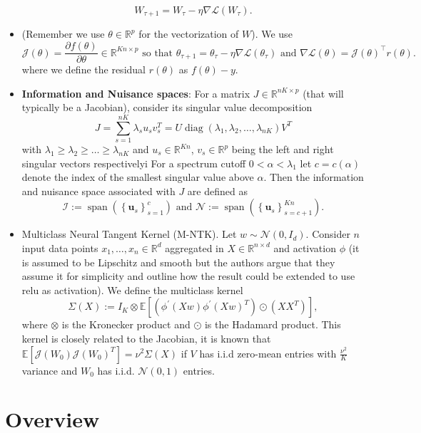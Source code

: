 \documentclass[a4paper]{article}
\newcommand{\R}{\mathbb{R}}
\begin{document}
\begin{itemize}
    \[
        W_{\tau+1}=W_{\tau}-\eta \nabla \mathcal{L}\left(W_{\tau}\right).
    \] 
\item (Remember we use $\theta\in\R^{p}$ for the vectorization of $W$). We use
    \[
        \mathcal{J}(\theta) = \frac{\partial f(\theta)}{\partial \theta}  \in \R^{Kn\times p}\text{ so that } \theta_{\tau+1} = \theta_\tau - \eta \nabla \mathcal{L}(\theta_\tau) \text{ and } \nabla\mathcal{L}(\theta) = \mathcal{J}(\theta)^\top r(\theta).
    \] 
    where we define the residual $r(\theta)$ as $f(\theta)- y$.
\item \textbf{Information and Nuisance spaces}: For a matrix $J \in \R^{nK\times p}$ (that will typically be a Jacobian), consider its singular value decomposition
    \[
    J=\sum_{s=1}^{n K} \lambda_{s} u_{s} v_{s}^{T}=U \operatorname{diag}\left(\lambda_{1}, \lambda_{2}, \ldots, \lambda_{n K}\right) V^{T}
    \] 
    with $\lambda_{1} \geq \lambda_{2} \geq \ldots \geq \lambda_{n K}$ and $u_s \in \R^{Kn}$, $v_s \in \R^p$ being the left and right singular vectors respectivelyi For a spectrum cutoff $0<\alpha<\lambda_1$ let $c = c(\alpha)$ denote the index of the smallest singular value above $\alpha$. Then the information and nuisance space associated with $J$ are defined as
    \[
\mathcal{I}:=\operatorname{span}\left(\left\{\boldsymbol{u}_{s}\right\}_{s=1}^{c}\right) \text { and } \mathcal{N}:=\operatorname{span}\left(\left\{\boldsymbol{u}_{s}\right\}_{s=c+1}^{K n}\right).
    \] 
\item Multiclass Neural Tangent Kernel (M-NTK). Let $w \sim \mathcal{N}(0, I_d)$. Consider $n$ input data points $x_1, \dots, x_n \in \R^d$ aggregated in $X \in \R^{n\times d}$ and activation $\phi$ (it is assumed to be Lipschitz and smooth but the authors argue that they assume it for simplicity and outline how the result could be extended to use relu as activation). We define the multiclass kernel 
    \[
    \Sigma(X):=I_{K} \otimes \mathbb{E}\left[\left(\phi^{\prime}(X w) \phi^{\prime}(X w)^{T}\right) \odot\left(X X^{T}\right)\right],
    \] 
where $\otimes$ is the Kronecker product and $\odot$ is the Hadamard product. This kernel is closely related to the Jacobian, it is known that $\mathbb{E}\left[\mathcal{J}\left(W_{0}\right) \mathcal{J}\left(W_{0}\right)^{T}\right]=\nu^{2} \Sigma(X)$ if $V$ has i.i.d zero-mean entries with $\frac{\nu^2}{K}$ variance and $W_0$ has i.i.d. $\mathcal{N}(0,1)$ entries.
    
\end{itemize}

\section{Overview}
\end{document}
